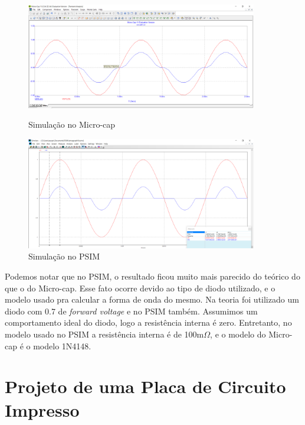 \begin{figure}[!htb]
    \begin{minipage}{0.5\textwidth}
    \centering
    \includegraphics[width = 0.9\textwidth]{Relatorio1_microcap_Diodo.png}
    \caption{Simulação no Micro-cap\cite{microcap}}
    \end{minipage}\hfill
    \begin{minipage}{0.5\textwidth}
    \centering
    \includegraphics[width = 0.9\textwidth]{Relatorio1_PSIM_Diodo.png}
    \caption{Simulação no PSIM\cite{psim}}
    \end{minipage}\hfill
\end{figure}

  Podemos notar que no PSIM, o resultado ficou muito mais parecido do teórico do que o do Micro-cap. Esse fato ocorre devido ao tipo de diodo utilizado, e o modelo usado pra calcular a forma de onda do mesmo. Na teoria foi utilizado um diodo com 0.7 de \textit{forward voltage} e no PSIM também. Assumimos um comportamento ideal do diodo, logo a resistência interna é zero. Entretanto, no modelo usado no PSIM a resistência interna é de 100m$\Omega$, e o modelo do Micro-cap é o modelo 1N4148.
  
\chapter{Projeto de uma Placa de Circuito Impresso }\label{cap_pcb}


